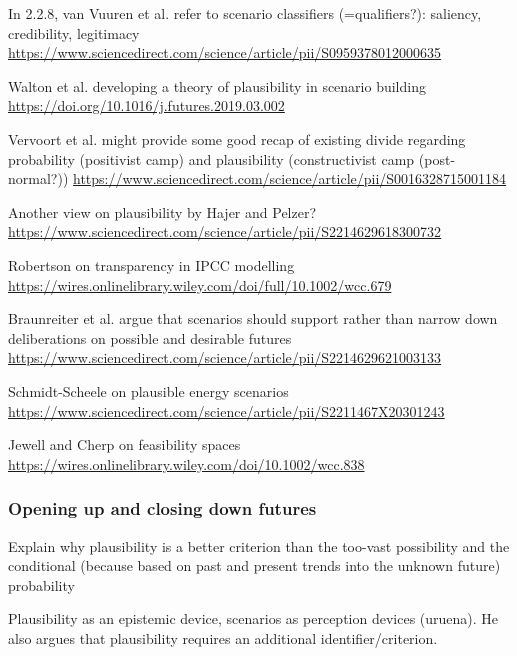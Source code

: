 \documentclass{article}
\begin{document}
\begin{refsection}
In 2.2.8, van Vuuren et al. refer to scenario classifiers (=qualifiers?): saliency, credibility, legitimacy \url{https://www.sciencedirect.com/science/article/pii/S0959378012000635}

Walton et al. developing a theory of plausibility in scenario building \url{https://doi.org/10.1016/j.futures.2019.03.002}

Vervoort et al. might provide some good recap of existing divide regarding probability (positivist camp) and plausibility (constructivist camp (post-normal?)) \url{https://www.sciencedirect.com/science/article/pii/S0016328715001184}

Another view on plausibility by Hajer and Pelzer? \url{https://www.sciencedirect.com/science/article/pii/S2214629618300732}

Robertson on transparency in IPCC modelling \url{https://wires.onlinelibrary.wiley.com/doi/full/10.1002/wcc.679}

Braunreiter et al. argue that scenarios should support rather than narrow down deliberations on possible and desirable futures \url{https://www.sciencedirect.com/science/article/pii/S2214629621003133}

Schmidt-Scheele on plausible energy scenarios \url{https://www.sciencedirect.com/science/article/pii/S2211467X20301243}

Jewell and Cherp on feasibility spaces \url{https://wires.onlinelibrary.wiley.com/doi/10.1002/wcc.838}

\subsubsection{Opening up and closing down futures}
Explain why plausibility is a better criterion than the too-vast possibility and the conditional (because based on past and present trends into the unknown future) probability

Plausibility as an epistemic device, scenarios as perception devices (uruena). He also argues that plausibility requires an additional identifier/criterion.


\end{refsection}
\end{document}
